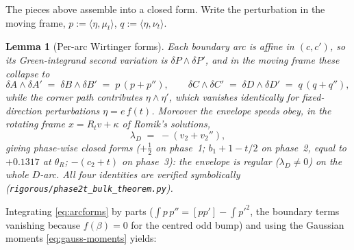 \documentclass[11pt]{amsart}
\theoremstyle{plain}
\newtheorem{lemma}[theorem]{Lemma}
\theoremstyle{definition}
\begin{document}
The pieces above assemble into a closed form.  Write the perturbation in
the moving frame, $p := \langle\eta,\mu_{t}\rangle$,
$q := \langle\eta,\nu_{t}\rangle$.

\begin{lemma}[Per-arc Wirtinger forms]\label{lem:arcforms}
Each boundary arc is affine in $(c,c')$, so its Green-integrand second
variation is $\delta P\wedge\delta P'$, and in the moving frame these
collapse to
\begin{equation}\label{eq:arcforms}
   \delta A\wedge\delta A' \;=\; \delta B\wedge\delta B'
   \;=\; p\,(p+p''),
   \qquad
   \delta C\wedge\delta C' \;=\; \delta D\wedge\delta D'
   \;=\; q\,(q+q''),
\end{equation}
while the corner path contributes $\eta\wedge\eta'$, which vanishes
identically for fixed-direction perturbations $\eta = e\,f(t)$.
Moreover the envelope speeds obey, in the rotating frame $x = R_{t}v +
\kappa$ of Romik's solutions,
\begin{equation}\label{eq:lam-identity}
   \lambda_{D} \;=\; -(v_{2} + v_{2}''),
\end{equation}
giving phase-wise closed forms ($+\tfrac12$ on phase~1;
$b_{1}+1-t/2$ on phase~2, equal to $+0.1317$ at $\theta_{R}$; $-(c_{2}+t)$
on phase~3): the envelope is regular ($\lambda_{D}\neq0$) on the whole
$D$-arc.  All four identities are verified symbolically
(\texttt{rigorous/phase2t\_bulk\_theorem.py}).
\end{lemma}

Integrating \eqref{eq:arcforms} by parts ($\int p\,p'' = [pp'] -
\int p'^{2}$, the boundary terms vanishing because $f(\beta)=0$ for the
centred odd bump) and using the Gaussian moments
\eqref{eq:gauss-moments} yields:
\end{document}

